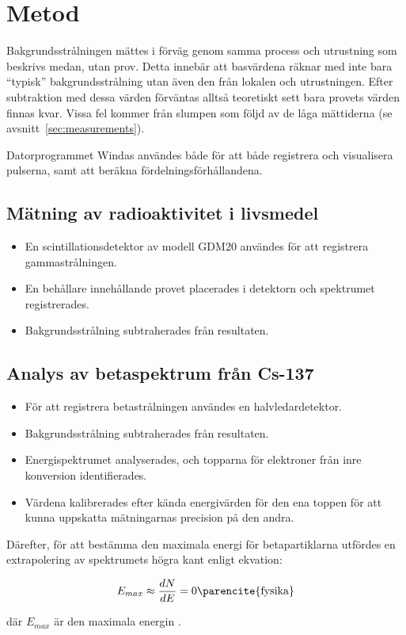 \section{Metod} \label{sec:method}

Bakgrundsstrålningen mättes i förväg genom samma process och utrustning som
beskrivs medan, utan prov. Detta innebär att basvärdena räknar med inte bara
``typisk'' bakgrundsstrålning utan även den från lokalen och utrustningen.
Efter subtraktion med dessa värden förväntas alltså teoretiskt sett bara
provets värden finnas kvar. Vissa fel kommer från slumpen som följd av de låga
mättiderna (se avsnitt~\ref{sec:measurements}).

Datorprogrammet Windas användes både för att både registrera och visualisera
pulserna, samt att beräkna fördelningsförhållandena.

\subsection{Mätning av radioaktivitet i livsmedel}

\begin{itemize}
    \item En scintillationsdetektor av modell GDM20 användes för att registrera
    gammastrålningen.

    \item En behållare innehållande provet placerades i detektorn och
    spektrumet registrerades.

    \item Bakgrundsstrålning subtraherades från resultaten.
\end{itemize}

\subsection{Analys av betaspektrum från Cs-137}

\begin{itemize}
    \item För att registrera betastrålningen användes en halvledardetektor.

    \item Bakgrundsstrålning subtraherades från resultaten.

    \item Energispektrumet analyserades, och topparna för elektroner från inre 
    konversion identifierades.

    \item Värdena kalibrerades efter kända energivärden för den ena toppen för
    att kunna uppskatta mätningarnas precision på den andra.
\end{itemize}


Därefter, för att bestämma den maximala energi för betapartiklarna utfördes en extrapolering av spektrumets högra kant enligt ekvation:

\begin{equation}
E_{max} \approx \frac{dN}{dE} = 0 \text{\parencite{fysika}}
\end{equation}

där $E_{max}$ är den maximala energin \parencite{yf}.
